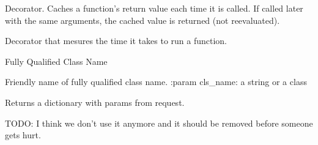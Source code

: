 \documentclass[a4paper,12pt,english]{sphinxmanual}
\begin{document}

\begin{fulllineitems}
\label{api:abilian.core.util.memoized}
Decorator. Caches a function's return value each time it is called.
If called later with the same arguments, the cached value is returned
(not reevaluated).

\end{fulllineitems}


\begin{fulllineitems}
\label{api:abilian.core.util.timer}
Decorator that mesures the time it takes to run a function.

\end{fulllineitems}


\begin{fulllineitems}
\label{api:abilian.core.util.fqcn}
Fully Qualified Class Name

\end{fulllineitems}


\begin{fulllineitems}
\label{api:abilian.core.util.friendly_fqcn}
Friendly name of fully qualified class name.
:param cls\_name: a string or a class

\end{fulllineitems}


\begin{fulllineitems}
\label{api:abilian.core.util.get_params}
Returns a dictionary with params from request.

TODO: I think we don't use it anymore and it should be removed before
someone gets hurt.

\end{fulllineitems}

\end{document}
